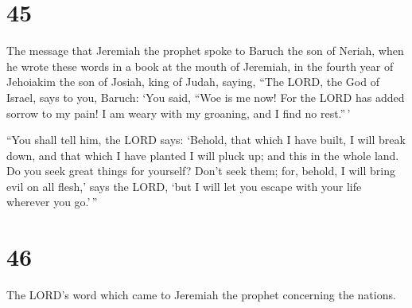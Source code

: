 \hypertarget{section-44}{%
\section{45}\label{section-44}}

 The message that Jeremiah the prophet spoke to Baruch the
son of Neriah, when he wrote these words in a book at the mouth of
Jeremiah, in the fourth year of Jehoiakim the son of Josiah, king of
Judah, saying,  ``The LORD, the God of Israel, says to you,
Baruch:  `You said, ``Woe is me now! For the LORD has added
sorrow to my pain! I am weary with my groaning, and I find no rest.''\,'

 ``You shall tell him, the LORD says: `Behold, that which I
have built, I will break down, and that which I have planted I will
pluck up; and this in the whole land.  Do you seek great
things for yourself? Don't seek them; for, behold, I will bring evil on
all flesh,' says the LORD, `but I will let you escape with your life
wherever you go.'\,''

\hypertarget{section-45}{%
\section{46}\label{section-45}}

 The LORD's word which came to Jeremiah the prophet
concerning the nations.

